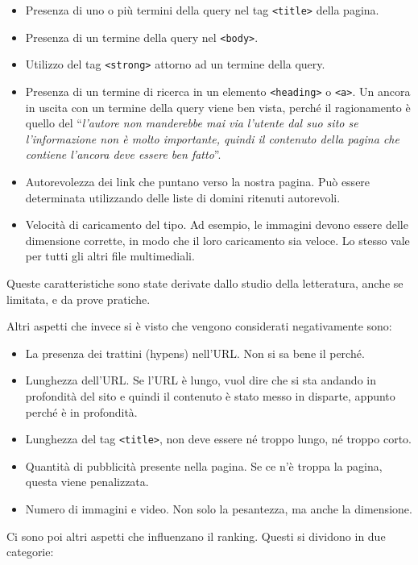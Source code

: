\begin{itemize}
	\item Presenza di uno o più termini della query nel tag \texttt{<title>} della pagina.
	\item Presenza di un termine della query nel \texttt{<body>}.
	\item Utilizzo del tag \texttt{<strong>} attorno ad un termine della query.
	\item Presenza di un termine di ricerca in un elemento \texttt{<heading>} o \texttt{<a>}. Un ancora in uscita con un termine della query viene ben vista, perché il ragionamento è quello del ``\textit{l'autore non manderebbe mai via l'utente dal suo sito se l'informazione non è molto importante, quindi il contenuto della pagina che contiene l'ancora deve essere ben fatto}''.
	\item Autorevolezza dei link che puntano verso la nostra pagina. Può essere determinata utilizzando delle liste di domini ritenuti autorevoli.
	\item Velocità di caricamento del tipo. Ad esempio, le immagini devono essere delle dimensione corrette, in modo che il loro caricamento sia veloce. Lo stesso vale per tutti gli altri file multimediali.
\end{itemize}

Queste caratteristiche sono state derivate dallo studio della letteratura, anche se limitata, e da prove pratiche.

Altri aspetti che invece si è visto che vengono considerati negativamente sono:

\begin{itemize}
	\item La presenza dei trattini (hypens) nell'URL. Non si sa bene il perché.
	\item Lunghezza dell'URL. Se l'URL è lungo, vuol dire che si sta andando in profondità del sito e quindi il contenuto è stato messo in disparte, appunto perché è in profondità.
	\item Lunghezza del tag \texttt{<title>}, non deve essere né troppo lungo, né troppo corto.
	\item Quantità di pubblicità presente nella pagina. Se ce n'è troppa la pagina, questa viene penalizzata.
	\item Numero di immagini e video. Non solo la pesantezza, ma anche la dimensione.
\end{itemize}

Ci sono poi altri aspetti che influenzano il ranking. Questi si dividono in due categorie:

